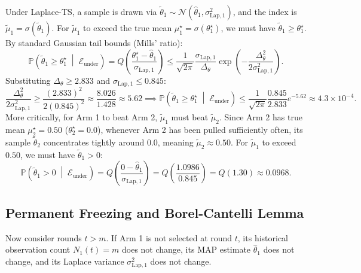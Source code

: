 \documentclass[twoside]{article}
\begin{document}
Under Laplace-TS, a sample is drawn via $\tilde{\theta}_1 \sim \mathcal{N}(\hat{\theta}_1, \sigma_{\text{Lap}, 1}^2)$, and the index is $\tilde{\mu}_1 = \sigma(\tilde{\theta}_1)$. For $\tilde{\mu}_1$ to exceed the true mean $\mu_1^\star = \sigma(\theta_1^\star)$, we must have $\tilde{\theta}_1 \ge \theta_1^\star$. By standard Gaussian tail bounds (Mills' ratio):
\begin{equation}
\mathbb{P}\left( \tilde{\theta}_1 \ge \theta_1^\star \;\middle|\; \mathcal{E}_{\text{under}} \right) = Q\left( \frac{\theta_1^\star - \hat{\theta}_1}{\sigma_{\text{Lap}, 1}} \right) \le \frac{1}{\sqrt{2\pi}} \frac{\sigma_{\text{Lap}, 1}}{\Delta_\theta} \exp\left( - \frac{\Delta_\theta^2}{2 \sigma_{\text{Lap}, 1}^2} \right).
\end{equation}
Substituting $\Delta_\theta \ge 2.833$ and $\sigma_{\text{Lap}, 1} \le 0.845$:
\begin{equation}
\frac{\Delta_\theta^2}{2 \sigma_{\text{Lap}, 1}^2} \ge \frac{(2.833)^2}{2 (0.845)^2} \approx \frac{8.026}{1.428} \approx 5.62 \implies \mathbb{P}\left( \tilde{\theta}_1 \ge \theta_1^\star \;\middle|\; \mathcal{E}_{\text{under}} \right) \le \frac{1}{\sqrt{2\pi}} \frac{0.845}{2.833} e^{-5.62} \approx 4.3 \times 10^{-4}.
\end{equation}
More critically, for Arm 1 to beat Arm 2, $\tilde{\mu}_1$ must beat $\tilde{\mu}_2$. Since Arm 2 has true mean $\mu_2^\star = 0.50$ ($\theta_2^\star = 0.0$), whenever Arm 2 has been pulled sufficiently often, its sample $\tilde{\theta}_2$ concentrates tightly around $0.0$, meaning $\tilde{\mu}_2 \approx 0.50$. For $\tilde{\mu}_1$ to exceed $0.50$, we must have $\tilde{\theta}_1 > 0$:
\begin{equation}
\mathbb{P}\left( \tilde{\theta}_1 > 0 \;\middle|\; \mathcal{E}_{\text{under}} \right) = Q\left( \frac{0 - \hat{\theta}_1}{\sigma_{\text{Lap}, 1}} \right) = Q\left( \frac{1.0986}{0.845} \right) = Q(1.30) \approx 0.0968.
\end{equation}

\subsection{Permanent Freezing and Borel-Cantelli Lemma}
Now consider rounds $t > m$. If Arm 1 is not selected at round $t$, its historical observation count $N_1(t) = m$ does not change, its MAP estimate $\hat{\theta}_1$ does not change, and its Laplace variance $\sigma_{\text{Lap}, 1}^2$ does not change.
\end{document}
